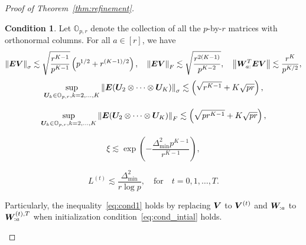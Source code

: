 \documentclass[lettersize,journal]{IEEEtran}
\theoremstyle{definition}
\theoremstyle{definition}
\newtheorem{condition}{Condition}
\newcommand{\of}[1]{\left(#1\right)}
\def\fixme#1#2{\textbf{\color{red}[FIXME (#1): #2]}}
\begin{document}
\begin{proof}[Proof of Theorem~\ref{thm:refinement}]
\begin{condition}\label{cond:origin} Let $\mathbb{O}_{p, r}$ denote the collection of all the $p$-by-$r$ matrices with orthonormal columns. For all $a \in [r]$, we have 
\begin{equation}\label{eq:cond1}
    \onorm{\mE \mV}_\sigma \lesssim \sqrt{\frac{r^{K-1}}{p^{K-1}}} \of{ p ^{1/2}+ r^{(K-1)/2}}, \quad \onorm{\mE \mV}_F \lesssim \sqrt{\frac{ r^{2(K-1)}}{p^{K-2}}},\quad \onorm{ \mW_{a:}^T \mE \mV} \lesssim \frac{r^K}{p^{K/2}},
\end{equation}
\begin{equation}\label{eq:cond2}
    \sup_{ \mU_k \in \mathbb{O}_{p, r}, k = 2,\ldots, K } \onorm{ \mE (\mU_{2} \otimes \cdots \otimes \mU_K)}_\sigma \lesssim \of{ \sqrt{r^{K-1}} + K\sqrt{pr}},
\end{equation}

\begin{equation}\label{eq:cond3}
    \sup_{ \mU_k \in \mathbb{O}_{p, r}, k = 2,\ldots, K } \onorm{ \mE (\mU_{2} \otimes \cdots \otimes \mU_K)}_F \lesssim \of{ \sqrt{pr^{K-1}} + K\sqrt{pr}},
\end{equation}

\begin{equation}\label{eq:cond_oracle}
    \xi \lesssim \exp\of{ - \frac{\Delta_{\min}^2 p^{K-1}}{r^{K-1}}},
\end{equation}



\begin{equation}\label{eq:cond_intial}
    L^{(t)} \lesssim \frac{\Delta_{\min}^2}{r \log p}, \quad \text{for} \quad t = 0, 1, \ldots, T.
\end{equation}
 
 Particularly, the inequality~\eqref{eq:cond1} holds by replacing $\bm{V}$ to $\bm{V}^{(t)}$ and $\bm{W}_{:a}$ to $\bm{W}_{:a}^{(t),T}$ when initialization condition~\eqref{eq:cond_intial} holds.
\end{condition}



\end{proof}
\end{document}
